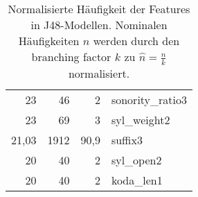 \begin{wraptable}{r}{6.5cm}
\begin{tabular}{|rrr|l|}
    23                     & 46                 & 2                & sonority\_ratio3 \\
    23                     & 69                 & 3                & syl\_weight2     \\
    21,03                  & 1912               & 90,9             & suffix3          \\
    20                     & 40                 & 2                & syl\_open2       \\
    20                     & 40                 & 2                & koda\_len1       \\ \hline
    \end{tabular}
    \caption{Normalisierte Häufigkeit der Features in J48-Modellen. Nominalen Häufigkeiten $n$ werden durch den branching factor $k$ zu $\hat{n}=\frac{n}{k}$ normalisiert.}
    \label{table:j48_feature_occurences}
\end{wraptable}